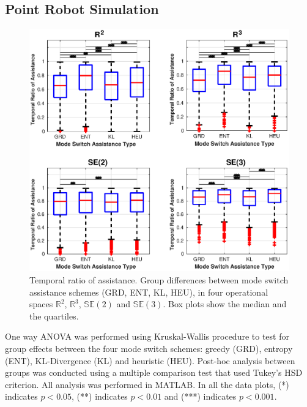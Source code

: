 \documentclass[letterpaper, 10 pt, conference]{ieeeconf}  %
\begin{document}
\subsection{Point Robot Simulation}
\begin{figure}[t]
	\centering
	\includegraphics[width= 1.1\hsize, height=0.42\vsize, center]{./figures/temporal_ratio_of_assistance.eps}
	\vspace{-0.8cm}
	\caption{Temporal ratio of assistance. Group differences between mode switch assistance schemes (GRD, ENT, KL, HEU), in four operational spaces $\mathbb{R}^2$, $\mathbb{R}^3$, $\mathbb{SE}(2)$ and $\mathbb{SE}(3)$. Box plots show the median and the quartiles.} 
	\label{fig:total_assistance}
\end{figure}
One way ANOVA was performed using Kruskal-Wallis procedure to test for group effects between the four mode switch schemes: greedy (GRD), entropy (ENT), KL-Divergence (KL) and heuristic (HEU). Post-hoc analysis between groups was conducted using a multiple comparison test that used Tukey's HSD criterion. All analysis was performed in MATLAB. In all the data plots, (*) indicates $p < 0.05$, (**) indicates $p < 0.01$ and (***) indicates $p < 0.001$.
\end{document}
